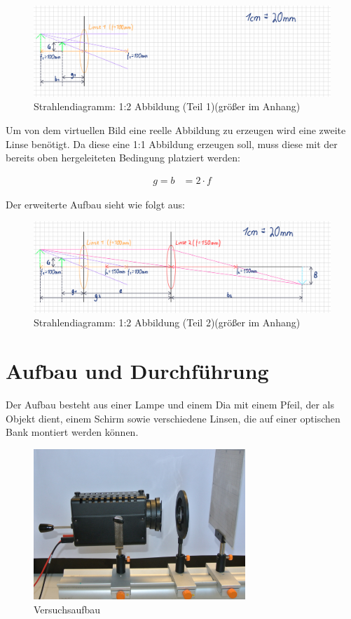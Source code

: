 \documentclass[a4paper]{scrartcl}
\numberwithin{equation}{subsection}
\begin{document}
\begin{figure}[H]
\includegraphics[width=16cm]{Abbildungen/zeichnung_zwei_linsen_1}
\centering
\caption{Strahlendiagramm: 1:2 Abbildung (Teil 1)(größer im Anhang)}
\centering
\label{fig:zeichnung_zwei_linsen_1}
\end{figure}

Um von dem virtuellen Bild eine reelle Abbildung zu erzeugen wird eine zweite Linse benötigt. Da diese eine 1:1 Abbildung erzeugen soll, muss diese mit der bereits oben hergeleiteten Bedingung platziert werden:

\begin{align*}
g = b &= 2 \cdot f
\end{align*}

Der erweiterte Aufbau sieht wie folgt aus:

\begin{figure}[H]
\includegraphics[width=16cm]{Abbildungen/zeichnung_zwei_linsen_2}
\centering
\caption{Strahlendiagramm: 1:2 Abbildung (Teil 2)(größer im Anhang)}
\centering
\label{fig:zeichnung_zwei_linsen_2}
\end{figure}

\newpage
\section{Aufbau und Durchführung}

Der Aufbau besteht aus einer Lampe und einem Dia mit einem Pfeil, der als Objekt dient, einem Schirm sowie verschiedene Linsen, die auf einer optischen Bank montiert werden können.

\begin{figure}[H]
\includegraphics[width=8cm]{Abbildungen/versuchsaufbau}
\centering
\caption{Versuchsaufbau \cite{anl}}
\centering
\label{fig:versuchsaufbau}
\end{figure}
\end{document}
